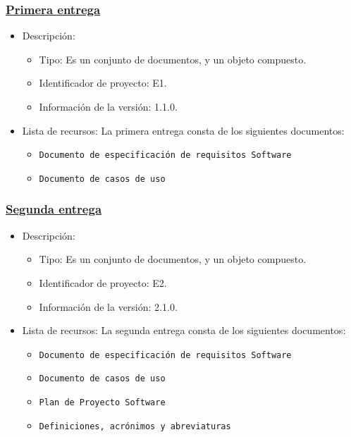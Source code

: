 \documentclass[spanish,a4paper,11pt, twoside]{report}	%
\begin{document}
			\subsubsection{\underline{Primera entrega}}
			\begin{itemize}	
				\item{Descripción:}
					\begin{itemize}	
						\item{Tipo:} Es un conjunto de documentos, y un objeto compuesto. 
						\item{Identificador de proyecto:} E1.
						\item{Información de la versión:} 1.1.0.
					\end{itemize}	
				\item{Lista de recursos:} La primera entrega consta de los siguientes documentos:
					\begin{itemize}	
						\item \texttt{Documento de especificación de requisitos Software} 
						\item \texttt{Documento de casos de uso} 
					\end{itemize}
			\end{itemize}	

			\subsubsection{\underline{Segunda entrega}}
			\begin{itemize}	
				\item{Descripción:} 
					\begin{itemize}	
						\item{Tipo:} Es un conjunto de documentos, y un objeto compuesto. 
						\item{Identificador de proyecto:} E2.
						\item{Información de la versión:} 2.1.0.
					\end{itemize}	
				\item{Lista de recursos:} La segunda entrega consta de los siguientes documentos:
					\begin{itemize}	
						\item \texttt{Documento de especificación de requisitos Software}
						\item \texttt{Documento de casos de uso}
						\item \texttt{Plan de Proyecto Software}
						\item \texttt{Definiciones, acrónimos y abreviaturas}
					\end{itemize}
			\end{itemize}
\end{document}
